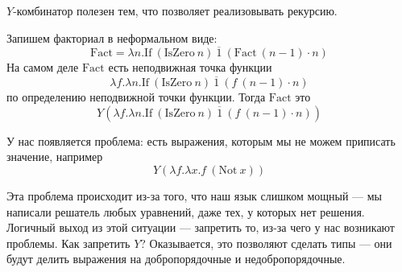 \(Y\)-комбинатор полезен тем, что позволяет реализовывать рекурсию.

\begin{example}
    Запишем факториал в неформальном виде:
    \[\mathrm{Fact} = \lambda n.\mathrm{If}\ (\mathrm{IsZero}\ n)\ \overline{1}\ (\mathrm{Fact}\ (n - 1) \cdot n)\]
    На самом деле \(\mathrm{Fact}\) есть неподвижная точка функции
    \[\lambda f.\lambda n.\mathrm{If}\ (\mathrm{IsZero}\ n)\ \overline{1}\ (f\ (n - 1) \cdot n)\]
    по определению неподвижной точки функции. Тогда \(\mathrm{Fact}\) это
    \[Y(\lambda f.\lambda n.\mathrm{If}\ (\mathrm{IsZero}\ n)\ \overline{1}\ (f\ (n - 1) \cdot n))\]
\end{example}

У нас появляется проблема: есть выражения, которым мы не можем приписать значение, например
\[Y(\lambda f.\lambda x.f\ (\mathrm{Not}\ x))\]

Эта проблема происходит из-за того, что наш язык слишком мощный --- мы написали решатель любых уравнений, даже тех, у которых нет решения. Логичный выход из этой ситуации --- запретить то, из-за чего у нас возникают проблемы. Как запретить \(Y\)? Оказывается, это позволяют сделать типы --- они будут делить выражения на добропорядочные и недобропорядочные.

